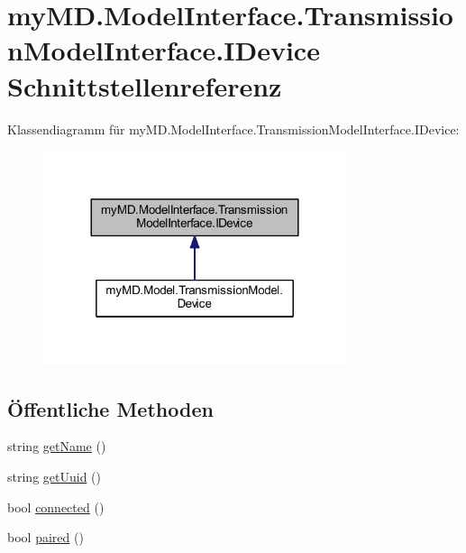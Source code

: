 \hypertarget{interfacemy_m_d_1_1_model_interface_1_1_transmission_model_interface_1_1_i_device}{}\section{my\+M\+D.\+Model\+Interface.\+Transmission\+Model\+Interface.\+I\+Device Schnittstellenreferenz}
\label{interfacemy_m_d_1_1_model_interface_1_1_transmission_model_interface_1_1_i_device}


Klassendiagramm für my\+M\+D.\+Model\+Interface.\+Transmission\+Model\+Interface.\+I\+Device\+:\nopagebreak
\begin{figure}[H]
\begin{center}
\leavevmode
\includegraphics[width=252pt]{interfacemy_m_d_1_1_model_interface_1_1_transmission_model_interface_1_1_i_device__inherit__graph}
\end{center}
\end{figure}
\subsection*{Öffentliche Methoden}
\begin{DoxyCompactItemize}
\item 
string \mbox{\hyperlink{interfacemy_m_d_1_1_model_interface_1_1_transmission_model_interface_1_1_i_device_a0642c516236dc1a58f6199a47f174427}{get\+Name}} ()
\item 
string \mbox{\hyperlink{interfacemy_m_d_1_1_model_interface_1_1_transmission_model_interface_1_1_i_device_a59013bc25e4ab2ef413e940d6e7c735f}{get\+Uuid}} ()
\item 
bool \mbox{\hyperlink{interfacemy_m_d_1_1_model_interface_1_1_transmission_model_interface_1_1_i_device_ab43328062cfb240bc8b942f77635aa86}{connected}} ()
\item 
bool \mbox{\hyperlink{interfacemy_m_d_1_1_model_interface_1_1_transmission_model_interface_1_1_i_device_a2979ec84b80f8ac2efcfc29797e1daa2}{paired}} ()
\end{DoxyCompactItemize}


